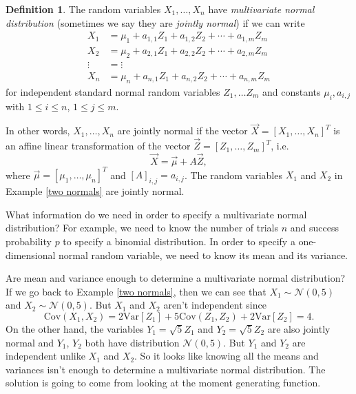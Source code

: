 \documentclass[12pt]{article}
\theoremstyle{plain}
\theoremstyle{definition}
\newtheorem{definition}[theorem]{Definition}
\theoremstyle{remark}
\newcommand{\Var}{\ensuremath{\textrm{Var}}}
\newcommand{\Cov}{\ensuremath{\textrm{Cov}}}
\begin{document}
\begin{definition}
    The random variables $X_1, \ldots, X_n$ have \emph{multivariate normal distribution} (sometimes we say they are \emph{jointly normal}) if we can write
    \begin{align*}
        X_1 &= \mu_1 + a_{1,1}Z_1 + a_{1,2}Z_2 + \cdots + a_{1,m}Z_m\\
        X_2 &= \mu_2 + a_{2,1}Z_1 + a_{2,2}Z_2 + \cdots + a_{2,m}Z_m\\
        \vdots &= \vdots\\
        X_n &= \mu_n + a_{n,1}Z_1 + a_{n,2}Z_2 + \cdots + a_{n,m}Z_m
    \end{align*}
    for independent standard normal random variables $Z_1, \ldots Z_m$ and constants $\mu_i, a_{i,j}$ with $1\leq i\leq n$, $1\leq j\leq m$.
\end{definition}
In other words, $X_1, \ldots, X_n$ are jointly normal if the vector $\vec{X} = [X_1, \ldots, X_n]^T$ is an affine linear transformation of the vector $\vec{Z} = [Z_1, \ldots, Z_m]^T$, i.e.
\[
    \vec{X} = \vec{\mu} + A\vec{Z},
\]
where $\vec{\mu} = [\mu_1, \ldots, \mu_n]^T$ and $[A]_{i,j} = a_{i,j}$.
The random variables $X_1$ and $X_2$ in Example \ref{two normals} are jointly normal.

What information do we need in order to specify a multivariate normal distribution?
For example, we need to know the number of trials $n$ and success probability $p$ to specify a binomial distribution.
In order to specify a one-dimensional normal random variable, we need to know its mean and its variance.

Are mean and variance enough to determine a multivariate normal distribution?
If we go back to Example \ref{two normals}, then we can see that $X_1 \sim \mathcal{N}(0, 5)$ and $X_2\sim \mathcal{N}(0,5)$.
But $X_1$ and $X_2$ aren't independent since
\[
    \Cov(X_1, X_2) = 2\Var[Z_1] + 5\Cov(Z_1, Z_2) + 2\Var[Z_2] = 4.
\]
On the other hand, the variables $Y_1 = \sqrt{5}Z_1$ and $Y_2 = \sqrt{5}Z_2$ are also jointly normal and $Y_1$, $Y_2$ both have distribution $\mathcal{N}(0,5)$.
But $Y_1$ and $Y_2$ are independent unlike $X_1$ and $X_2$.
So it looks like knowing all the means and variances isn't enough to determine a multivariate normal distribution.
The solution is going to come from looking at the moment generating function.
\end{document}
